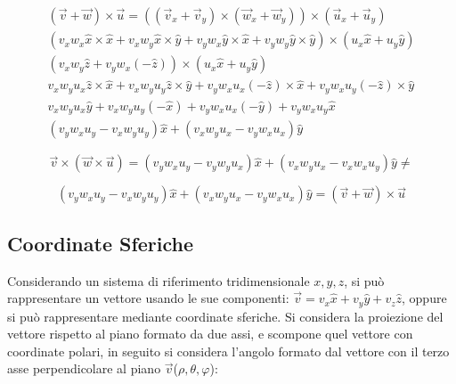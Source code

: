 \documentclass{article}
\numberwithin{equation}{subsection}
\begin{document}
\begin{gather}
    (\vec{v}+\vec{w})\times\vec{u}=((\vec{v}_x+\vec{v}_y)\times(\vec{w}_x+\vec{w}_y))\times(\vec{u}_x+\vec{u}_y)\\
    (v_xw_x\hat{x}\times\hat{x}+v_xw_y\hat{x}\times\hat{y}+v_yw_x\hat{y}\times\hat{x}+v_yw_y\hat{y}\times\hat{y})\times(u_x\hat{x}+u_y\hat{y})\\
    (v_xw_y\hat{z}+v_yw_x(-\hat{z}))\times(u_x\hat{x}+u_y\hat{y})\\
    v_xw_yu_x\hat{z}\times\hat{x}+v_xw_yu_y\hat{z}\times\hat{y}+v_yw_xu_x(-\hat{z})\times\hat{x}+v_yw_xu_y(-\hat{z})\times\hat{y}\\
    v_xw_yu_x\hat{y}+v_xw_yu_y(-\hat{x})+v_yw_xu_x(-\hat{y})+v_yw_xu_y\hat{x}\\
    (v_yw_xu_y-v_xw_yu_y)\hat{x}+(v_xw_yu_x-v_yw_xu_x)\hat{y}
\end{gather}

\begin{equation}
    \vec{v}\times(\vec{w}\times\vec{u})=(v_yw_xu_y-v_yw_yu_x)\hat{x}+(v_xw_yu_x-v_xw_xu_y)\hat{y}\neq
\end{equation}

\begin{equation*}
    (v_yw_xu_y-v_xw_yu_y)\hat{x}+(v_xw_yu_x-v_yw_xu_x)\hat{y}=(\vec{v}+\vec{w})\times\vec{u}
\end{equation*}

\begin{center}\end{center}

\subsection{Coordinate Sferiche}
Considerando un sistema di riferimento tridimensionale 
$x, y, z$, si può rappresentare un vettore usando le sue 
componenti: $\vec{v} = v_x\hat{x} + v_y\hat{y} + v_z\hat{z}$,
oppure si può rappresentare mediante coordinate sferiche.
Si considera la proiezione del vettore rispetto al piano formato da due assi, e scompone quel vettore con coordinate polari, in seguito si considera l'angolo formato dal vettore con il terzo asse perpendicolare al piano $\vec{v}$($\rho, \theta, \varphi$):\\
\end{document}
